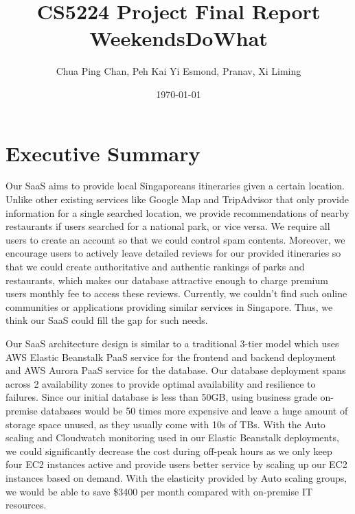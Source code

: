 \documentclass[a4paper]{article}
\begin{document}
\pagestyle{plain}
\title{
    CS5224 Project Final Report\\
    WeekendsDoWhat
}
\author{Chua Ping Chan, Peh Kai Yi Esmond, Pranav, Xi Liming}
\date{\today}
\maketitle
{}

\renewcommand{\contentsname}{Table of Contents}	%
\tableofcontents

\fontsize{12}{1.2}

\newpage
\section{Executive Summary}

Our SaaS aims to provide local Singaporeans itineraries given a certain location. Unlike other existing services like Google Map and TripAdvisor that only provide information for a single searched location, we provide recommendations of nearby restaurants if users searched for a national park, or vice versa. We require all users to create an account so that we could control spam contents. Moreover, we encourage users to actively leave detailed reviews for our provided itineraries so that we could create authoritative and authentic rankings of parks and restaurants, which makes our database attractive enough to charge premium users monthly fee to access these reviews. Currently, we couldn’t find such online communities or applications providing similar services in Singapore. Thus, we think our SaaS could fill the gap for such needs. 

Our SaaS architecture design is similar to a traditional 3-tier model which uses AWS Elastic Beanstalk PaaS service for the frontend and backend deployment and AWS Aurora PaaS service for the database. Our database deployment spans across 2 availability zones to provide optimal availability and resilience to failures. Since our initial database is less than 50GB, using business grade on-premise databases would be 50 times more expensive and leave a huge amount of storage space unused, as they usually come with 10s of TBs. With the Auto scaling and Cloudwatch monitoring used in our Elastic Beanstalk deployments, we could significantly decrease the cost during off-peak hours as we only keep four EC2 instances active and provide users better service by scaling up our EC2 instances based on demand. With the elasticity provided by Auto scaling groups, we would be able to save \$3400 per month compared with on-premise IT resources.
\end{document}
